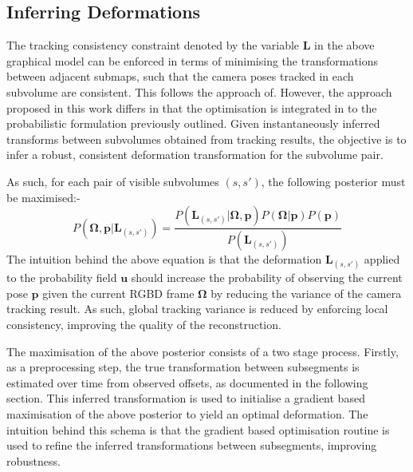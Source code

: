 \subsection{Inferring Deformations}
The tracking consistency constraint denoted by the variable $\mathbf{L}$ in the above graphical model can be enforced in terms of minimising the 
transformations between adjacent submaps, such that the camera poses tracked in each subvolume are consistent. This follows the approach 
of\cite{Kahler2016}.  However, the approach proposed in this work differs in that the optimisation is integrated in to the probabilistic 
formulation previously outlined. Given instantaneously inferred transforms between subvolumes obtained from tracking results, 
the objective is to infer a robust, consistent deformation transformation for the subvolume pair.

As such, for each pair of visible subvolumes $(s, s')$, the following posterior must be maximised:-
\begin{equation}
P(\mathbf{\Omega}, \mathbf{p} | \mathbf{L}_{(s, s')}) = \frac{P(\mathbf{L}_{(s, s')} | \mathbf{\Omega}, \mathbf{p}) P(\mathbf{\Omega} | \mathbf{p})P(\mathbf{p})}
{P(\mathbf{L}_{(s, s')})}
\end{equation}
The intuition behind the above equation is that the deformation $\mathbf{L}_{(s, s')}$ applied to the probability field $\mathbf{u}$ should 
increase the probability of observing the current pose $\mathbf{p}$ given the current RGBD frame $\mathbf{\Omega}$ by reducing the 
variance of the camera tracking result. As such, global tracking variance is reduced by enforcing local consistency, improving the quality 
of the reconstruction.

The maximisation of the above posterior consists of a two stage process. Firstly, as a preprocessing step, the true transformation between 
subsegments is estimated over time from observed offsets, as documented in the following section. This inferred transformation is used to 
initialise a gradient based maximisation of the above posterior to yield an optimal deformation. The intuition behind this schema is that the 
gradient based optimisation routine is used to refine the inferred transformations between subsegments, improving robustness.

